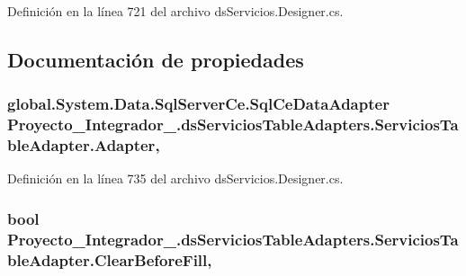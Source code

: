 Definición en la línea 721 del archivo ds\-Servicios.\-Designer.\-cs.



\subsection{Documentación de propiedades}
\hypertarget{class_proyecto___integrador__3_1_1ds_servicios_table_adapters_1_1_servicios_table_adapter_a6e2d84a1b2c925ab5f078c403b1e3ecf}{
\subsubsection[{Adapter}]{\setlength{\rightskip}{0pt plus 5cm}global.\-System.\-Data.\-Sql\-Server\-Ce.\-Sql\-Ce\-Data\-Adapter Proyecto\-\_\-\-Integrador\-\_.\-ds\-Servicios\-Table\-Adapters.\-Servicios\-Table\-Adapter.\-Adapter\hspace{0.3cm}{\ttfamily [get]}, {\ttfamily [package]}}}\label{class_proyecto___integrador__3_1_1ds_servicios_table_adapters_1_1_servicios_table_adapter_a6e2d84a1b2c925ab5f078c403b1e3ecf}


Definición en la línea 735 del archivo ds\-Servicios.\-Designer.\-cs.

\hypertarget{class_proyecto___integrador__3_1_1ds_servicios_table_adapters_1_1_servicios_table_adapter_a10403cf7d526506e7a350a7ba70cc6ec}{
\subsubsection[{Clear\-Before\-Fill}]{\setlength{\rightskip}{0pt plus 5cm}bool Proyecto\-\_\-\-Integrador\-\_.\-ds\-Servicios\-Table\-Adapters.\-Servicios\-Table\-Adapter.\-Clear\-Before\-Fill\hspace{0.3cm}{\ttfamily [get]}, {\ttfamily [set]}}}\label{class_proyecto___integrador__3_1_1ds_servicios_table_adapters_1_1_servicios_table_adapter_a10403cf7d526506e7a350a7ba70cc6ec}



